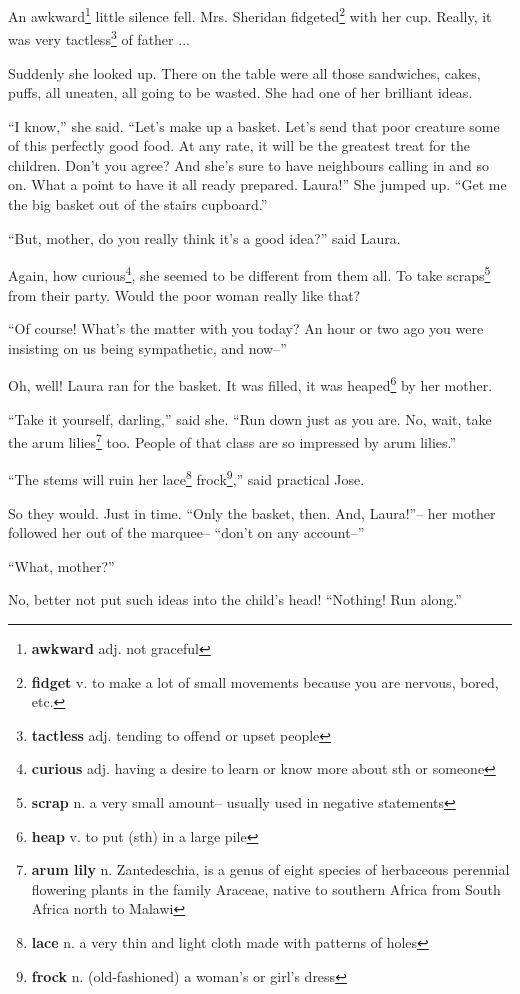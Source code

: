 An awkward\footnote{\textbf{awkward} adj. not graceful} little silence fell. Mrs. Sheridan fidgeted\footnote{\textbf{fidget} v. to make a lot of small movements because you are nervous, bored, etc.} with her cup. Really, it was very tactless\footnote{\textbf{tactless} adj. tending to offend or upset people} of father ...

Suddenly she looked up. There on the table were all those sandwiches, cakes, puffs, all uneaten, all going to be wasted. She had one of her brilliant ideas.

``I know,'' she said. ``Let's make up a basket. Let's send that poor creature some of this perfectly good food. At any rate, it will be the greatest treat for the children. Don't you agree? And she's sure to have neighbours calling in and so on. What a point to have it all ready prepared. Laura!'' She jumped up. ``Get me the big basket out of the stairs cupboard.''

``But, mother, do you really think it's a good idea?'' said Laura.

Again, how curious\footnote{\textbf{curious} adj. having a desire to learn or know more about sth or someone}, she seemed to be different from them all. To take scraps\footnote{\textbf{scrap} n. a very small amount-- usually used in negative statements} from their party. Would the poor woman really like that?

``Of course! What's the matter with you today? An hour or two ago you were insisting on us being sympathetic, and now--''

Oh, well! Laura ran for the basket. It was filled, it was heaped\footnote{\textbf{heap} v. to put (sth) in a large pile} by her mother.

``Take it yourself, darling,'' said she. ``Run down just as you are. No, wait, take the arum lilies\footnote{\textbf{arum lily} n. Zantedeschia,  is a genus of eight species of herbaceous perennial flowering plants in the family Araceae, native to southern Africa from South Africa north to Malawi} too. People of that class are so impressed by arum lilies.''

``The stems will ruin her lace\footnote{\textbf{lace} n. a very thin and light cloth made with patterns of holes} frock\footnote{\textbf{frock} n. (old-fashioned) a woman's or girl's dress},'' said practical Jose.

So they would. Just in time. ``Only the basket, then. And, Laura!''-- her mother followed her out of the marquee-- ``don't on any account--''

``What, mother?''

No, better not put such ideas into the child's head! ``Nothing! Run along.''
